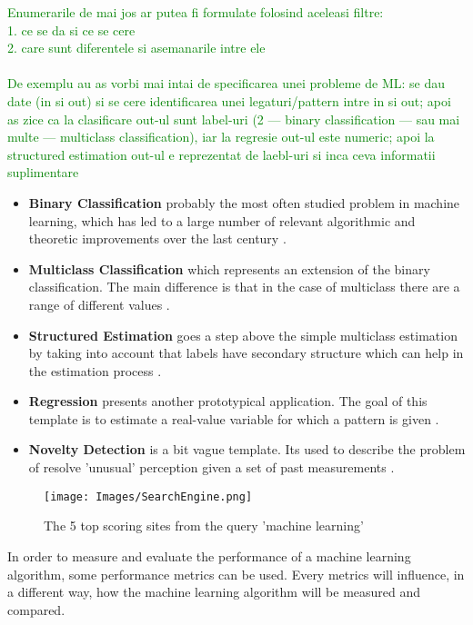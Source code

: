 \textcolor{green}{Enumerarile de mai jos ar putea fi formulate folosind aceleasi filtre:\\
1. ce se da si ce se cere\\
2. care sunt diferentele si asemanarile intre ele\\
\\
De exemplu au as vorbi mai intai de specificarea unei probleme de ML: se dau date (in si out) si se cere identificarea unei legaturi/pattern intre in si out; apoi as zice ca la clasificare out-ul sunt label-uri (2 --- binary classification --- sau mai multe --- multiclass classification), iar la regresie out-ul este numeric; apoi la structured estimation out-ul e reprezentat de laebl-uri si inca ceva informatii suplimentare
}

\begin{itemize}
  \item \textbf{Binary Classification} probably the most often studied problem in machine learning, which has led to a large number of relevant algorithmic and theoretic improvements over the last century \cite{MLIntro}.
  \item \textbf{Multiclass Classification} which represents an extension of the binary classification. The main difference is that in the case of multiclass there are a range of different values \cite{MLIntro}.
  \item \textbf{Structured Estimation} goes a step above the simple multiclass estimation by taking into account that labels have secondary structure which can help in the estimation process \cite{MLIntro}.
  \item \textbf{Regression} presents another prototypical application. The goal of this template is to estimate a real-value variable for which a pattern is given \cite{MLIntro}.
  \item \textbf{Novelty Detection} is a bit vague template. Its used to describe the problem of resolve 'unusual' perception given a set of past measurements \cite{MLIntro}.
\end{itemize}

\begin{figure}[h!]
    \centering
    \texttt{[image: Images/SearchEngine.png]}
    \caption{The 5 top scoring sites from the query 'machine learning' \cite{MLIntro}}
    \label{fig:SearchEngine}
\end{figure}

In order to measure and evaluate the performance of a machine learning algorithm, some performance metrics can be used. Every metrics will influence, in a different way, how the machine learning algorithm will be measured and compared. 

